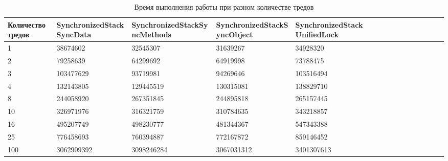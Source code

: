 \documentclass[12pt]{article}
\begin{document}
  \begin{table}[ht!]
	    \caption{Время выполнения работы при разном количестве тредов}
	    \label{sandp}
	    \begin{tabular}{lllllllllllllll}
		\hline
		Количество тредов &SynchronizedStackSyncData&SynchronizedStackSyncMethods&SynchronizedStackSyncObject&SynchronizedStackUnifiedLock\\
		\hline
		1&38674602&32545307&31639267&34928320\\
		\hline
		2&79258639&64299692&64919998&73788475\\
		\hline
		3&103477629&93719981&94269646&103516494\\
		\hline
		4&132143805&129445519&130315081&138829710\\
		\hline
		8&244058920&267351845&244895818&265157445\\
		\hline
		10&326971976&316321759&310784635&343218857\\
		\hline
		16&495207749&498230777&481344367&547343388\\
		\hline
		25&776458693&760394887&772167872&859146452\\
		\hline
		100&3062909392&3098246284&3067031312&3401307613\\
	    \end{tabular}
	\end{table}  
	
\end{document}
